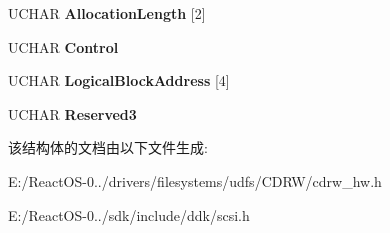 \begin{DoxyCompactItemize}
\item 
\mbox{\label{struct___c_d_b_1_1___r_e_a_d___h_e_a_d_e_r_afc0011a164c3ae842312d6e5b7a19b41}} 
U\+C\+H\+AR {\bfseries Allocation\+Length} \mbox{[}2\mbox{]}
\item 
\mbox{\label{struct___c_d_b_1_1___r_e_a_d___h_e_a_d_e_r_a048eeaeaf2544f7f231b5de58d258b46}} 
U\+C\+H\+AR {\bfseries Control}
\item 
\mbox{\label{struct___c_d_b_1_1___r_e_a_d___h_e_a_d_e_r_afc39799877b995182a40fbfcff7e052a}} 
U\+C\+H\+AR {\bfseries Logical\+Block\+Address} \mbox{[}4\mbox{]}
\item 
\mbox{\label{struct___c_d_b_1_1___r_e_a_d___h_e_a_d_e_r_aff907db5079905dddbd06020bd061017}} 
U\+C\+H\+AR {\bfseries Reserved3}
\end{DoxyCompactItemize}


该结构体的文档由以下文件生成\+:\begin{DoxyCompactItemize}
\item 
E\+:/\+React\+O\+S-\/0../drivers/filesystems/udfs/\+C\+D\+R\+W/cdrw\+\_\+hw.\+h\item 
E\+:/\+React\+O\+S-\/0../sdk/include/ddk/scsi.\+h\end{DoxyCompactItemize}

